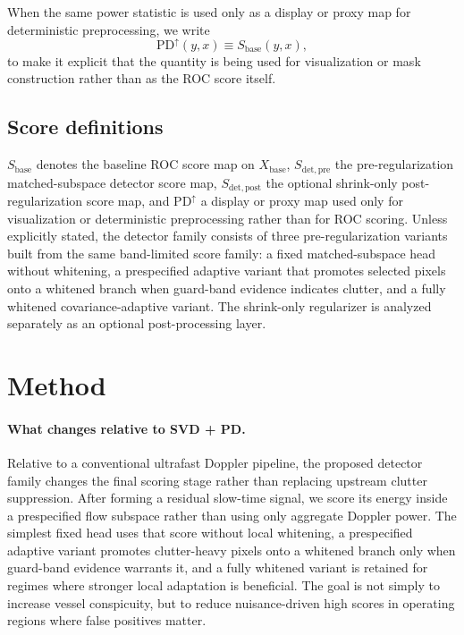 \documentclass[11pt]{article}
\begin{document}
\noindent When the same power statistic is used only as a display or proxy map for deterministic preprocessing, we write
\[
  \mathrm{PD}^{\uparrow}(y,x)\equiv S_{\mathrm{base}}(y,x),
\]
to make it explicit that the quantity is being used for visualization or mask construction rather than as the ROC score itself.

\subsection{Score definitions}
\addtocounter{table}{1}
$S_{\mathrm{base}}$ denotes the baseline ROC score map on $X_{\mathrm{base}}$, $S_{\mathrm{det,pre}}$ the pre-regularization matched-subspace detector score map, $S_{\mathrm{det,post}}$ the optional shrink-only post-regularization score map, and $\mathrm{PD}^{\uparrow}$ a display or proxy map used only for visualization or deterministic preprocessing rather than for ROC scoring. Unless explicitly stated, the detector family consists of three pre-regularization variants built from the same band-limited score family: a fixed matched-subspace head without whitening, a prespecified adaptive variant that promotes selected pixels onto a whitened branch when guard-band evidence indicates clutter, and a fully whitened covariance-adaptive variant. The shrink-only regularizer is analyzed separately as an optional post-processing layer.

\section{Method}
\label{sec:method}
\label{sec:stap-architecture}
\label{sec:ka-contract-v2} %

\paragraph{What changes relative to SVD + PD.}
Relative to a conventional ultrafast Doppler pipeline, the proposed detector family changes the final scoring stage rather than replacing upstream clutter suppression. After forming a residual slow-time signal, we score its energy inside a prespecified flow subspace rather than using only aggregate Doppler power. The simplest fixed head uses that score without local whitening, a prespecified adaptive variant promotes clutter-heavy pixels onto a whitened branch only when guard-band evidence warrants it, and a fully whitened variant is retained for regimes where stronger local adaptation is beneficial. The goal is not simply to increase vessel conspicuity, but to reduce nuisance-driven high scores in operating regions where false positives matter.
\end{document}

